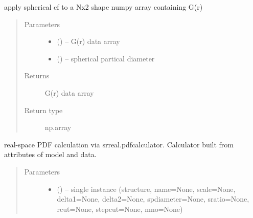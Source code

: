 \documentclass[letterpaper,10pt,english]{sphinxmanual}
\begin{document}
\begin{fulllineitems}
\begin{fulllineitems}
\end{fulllineitems}


\begin{fulllineitems}
\label{\detokenize{rst/pairdistributionfunction:mstack.pairdistributionfunction.PdfRefinement.apply_sphericalcf}}
apply spherical cf to a Nx2 shape numpy array containing G(r)
\begin{quote}\begin{description}
\item[{Parameters}] \leavevmode\begin{itemize}
\item {} 
 () -- G(r) data array

\item {} 
 () -- spherical partical diameter

\end{itemize}

\item[{Returns}] \leavevmode
G(r) data array

\item[{Return type}] \leavevmode
np.array

\end{description}\end{quote}

\end{fulllineitems}


\begin{fulllineitems}
\label{\detokenize{rst/pairdistributionfunction:mstack.pairdistributionfunction.PdfRefinement.calculator}}
real-space PDF calculation via srreal.pdfcalculator. Calculator built
from attributes of model and data.
\begin{quote}\begin{description}
\item[{Parameters}] \leavevmode\begin{itemize}
\item {} 
 ({\hyperref[\detokenize{rst/pairdistributionfunction:mstack.pairdistributionfunction.PdfModel}]{}}) -- single instance
(structure, name=None, scale=None, delta1=None, delta2=None,
spdiameter=None, sratio=None, rcut=None, stepcut=None, mno=None)


\end{itemize}
\end{description}
\end{quote}
\end{fulllineitems}
\end{fulllineitems}
\end{document}
